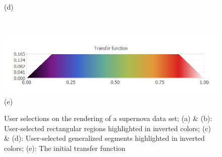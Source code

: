 \documentclass[twoside,twocolumn,10pt]{article}
\begin{document}
\begin{figure}
\begin{minipage}{.16\textwidth}
		(d)
	\end{minipage}~
	\begin{minipage}{.16\textwidth}
	\centering
	\includegraphics[width=1\linewidth]{supernova_transfer_function}
	(e)
	\end{minipage}
	\caption{User selections on the rendering of a supernova data set; (a) \& (b): User-selected rectangular regions highlighted in inverted colors; (c) \& (d): User-selected generalized segments highlighted in inverted colors; (e): The initial transfer function}
	\label{fig:supernova_selection}
\end{figure}
\end{document}
